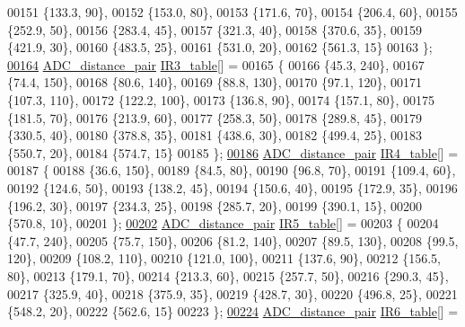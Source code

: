 \begin{DoxyCode}
00151     \{133.3, 90\},
00152     \{153.0, 80\},
00153     \{171.6, 70\},
00154     \{206.4, 60\},
00155     \{252.9, 50\},
00156     \{283.4, 45\},
00157     \{321.3, 40\},
00158     \{370.6, 35\},
00159     \{421.9, 30\},
00160     \{483.5, 25\},
00161     \{531.0, 20\},
00162     \{561.3, 15\}
00163 \};  
\hypertarget{sensor_8h_source.tex_l00164}{}\hyperlink{sensor_8h_ae2d11b07f5d070503671bd7db51a040a}{00164} \hyperlink{struct_a_d_c__distance__pair}{ADC\_distance\_pair} \hyperlink{sensor_8h_ae2d11b07f5d070503671bd7db51a040a}{IR3\_table}[] =
00165 \{
00166     \{45.3, 240\},
00167     \{74.4, 150\},
00168     \{80.6, 140\},
00169     \{88.8, 130\},
00170     \{97.1, 120\},
00171     \{107.3, 110\},
00172     \{122.2, 100\},
00173     \{136.8, 90\},
00174     \{157.1, 80\},
00175     \{181.5, 70\},
00176     \{213.9, 60\},
00177     \{258.3, 50\},
00178     \{289.8, 45\},
00179     \{330.5, 40\},
00180     \{378.8, 35\},
00181     \{438.6, 30\},
00182     \{499.4, 25\},
00183     \{550.7, 20\},
00184     \{574.7, 15\}
00185 \};  
\hypertarget{sensor_8h_source.tex_l00186}{}\hyperlink{sensor_8h_af0f2d3338f8aeee7a6dfe23213e562f6}{00186} \hyperlink{struct_a_d_c__distance__pair}{ADC\_distance\_pair} \hyperlink{sensor_8h_af0f2d3338f8aeee7a6dfe23213e562f6}{IR4\_table}[] =
00187 \{
00188     \{36.6, 150\},
00189     \{84.5, 80\},
00190     \{96.8, 70\},
00191     \{109.4, 60\},
00192     \{124.6, 50\},
00193     \{138.2, 45\},
00194     \{150.6, 40\},
00195     \{172.9, 35\},
00196     \{196.2, 30\},
00197     \{234.3, 25\},
00198     \{285.7, 20\},
00199     \{390.1, 15\},
00200     \{570.8, 10\},
00201 \};  
\hypertarget{sensor_8h_source.tex_l00202}{}\hyperlink{sensor_8h_acd33e89ce7fb300b6edfe6cdd6945a36}{00202} \hyperlink{struct_a_d_c__distance__pair}{ADC\_distance\_pair} \hyperlink{sensor_8h_acd33e89ce7fb300b6edfe6cdd6945a36}{IR5\_table}[] =
00203 \{
00204     \{47.7, 240\},
00205     \{75.7, 150\},
00206     \{81.2, 140\},
00207     \{89.5, 130\},
00208     \{99.5, 120\},
00209     \{108.2, 110\},
00210     \{121.0, 100\},
00211     \{137.6, 90\},
00212     \{156.5, 80\},
00213     \{179.1, 70\},
00214     \{213.3, 60\},
00215     \{257.7, 50\},
00216     \{290.3, 45\},
00217     \{325.9, 40\},
00218     \{375.9, 35\},
00219     \{428.7, 30\},
00220     \{496.8, 25\},
00221     \{548.2, 20\},
00222     \{562.6, 15\}
00223 \};  
\hypertarget{sensor_8h_source.tex_l00224}{}\hyperlink{sensor_8h_a919f2d74de392de03219cc9a9a662013}{00224} \hyperlink{struct_a_d_c__distance__pair}{ADC\_distance\_pair} \hyperlink{sensor_8h_a919f2d74de392de03219cc9a9a662013}{IR6\_table}[] =

\end{DoxyCode}
